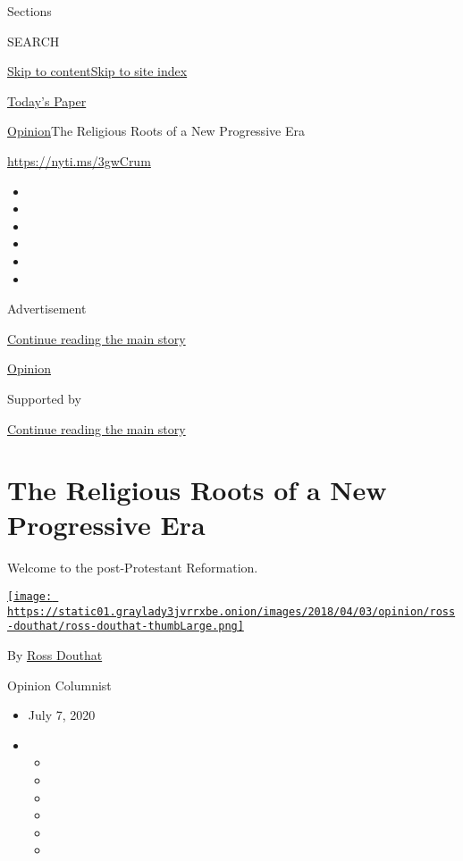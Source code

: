 Sections

SEARCH

\protect\hyperlink{site-content}{Skip to
content}\protect\hyperlink{site-index}{Skip to site index}

\href{https://myaccount.nytimes3xbfgragh.onion/auth/login?response_type=cookie\&client_id=vi}{}

\href{https://www.nytimes3xbfgragh.onion/section/todayspaper}{Today's
Paper}

\href{/section/opinion}{Opinion}\textbar{}The Religious Roots of a New
Progressive Era

\url{https://nyti.ms/3gwCrum}

\begin{itemize}
\item
\item
\item
\item
\item
\item
\end{itemize}

Advertisement

\protect\hyperlink{after-top}{Continue reading the main story}

\href{/section/opinion}{Opinion}

Supported by

\protect\hyperlink{after-sponsor}{Continue reading the main story}

\hypertarget{the-religious-roots-of-a-new-progressive-era}{%
\section{The Religious Roots of a New Progressive
Era}\label{the-religious-roots-of-a-new-progressive-era}}

Welcome to the post-Protestant Reformation.

\href{https://www.nytimes3xbfgragh.onion/by/ross-douthat}{\texttt{[image: https://static01.graylady3jvrrxbe.onion/images/2018/04/03/opinion/ross-douthat/ross-douthat-thumbLarge.png]}}

By \href{https://www.nytimes3xbfgragh.onion/by/ross-douthat}{Ross
Douthat}

Opinion Columnist

\begin{itemize}
\item
  July 7, 2020
\item
  \begin{itemize}
  \item
  \item
  \item
  \item
  \item
  \item
  \end{itemize}
\end{itemize}

